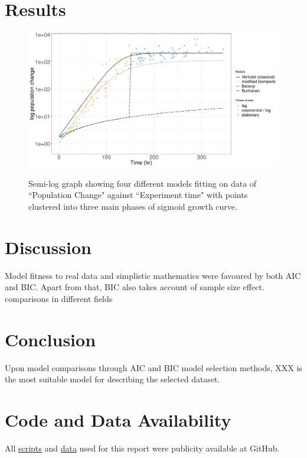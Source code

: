 \documentclass[a4paper, 11pt]{article}
\begin{document}
	\section*{Results}
	\begin{figure}[h]
		\centering\includegraphics[width=\linewidth]{Log_data.pdf}\label{semi-log}
		\caption{Semi-log graph showing four different models fitting on data of ``Population Change" against ``Experiment time" with points clustered into three main phases of sigmoid growth curve.}
	\end{figure}
	\section*{Discussion}
	Model fitness to real data and simplistic mathematics were favoured by both AIC\autocite{johnson2004model,akaike1998information,burnhamdr} and BIC\autocite{johnson2004model,turchin2003complex}.  Apart from that, BIC also takes account of sample size effect\autocite{johnson2004model,turchin2003complex}.\\
	comparisons in different fields\autocite{kuha2004aic,aho2014model,yang2005can,penny2012comparing,vrieze2012model,wang2006comparison,acquah2010comparison}
	
	\section*{Conclusion}
	Upon model comparisons through AIC\autocite{akaike1998information,burnhamdr} and BIC\autocite{schwarz1978estimating} model selection methods, XXX is the most suitable model for describing the selected dataset.
	\section*{Code and Data Availability}
	All \href{https://github.com/ph-u/CMEECourseWork_pmH/tree/master/MiniProject/code}{scripts} and \href{https://github.com/ph-u/CMEECourseWork_pmH/tree/master/MiniProject/data}{data} used for this report were publicity available at GitHub.
	\nocite{*}\printbibliography
\end{document}
